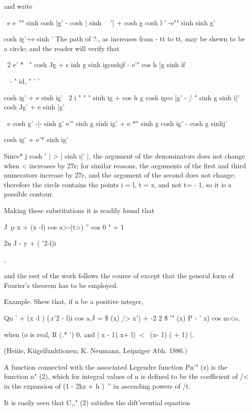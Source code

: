 {{{and write

\ e e~"" sinh cosh |g' - cosh | sinh \ \ '] + cosh g cosh l ' -e""
sinh sinh g'

cosh ig'+e sinh ' The path of ?:, as increases from - tt to tt, may be
shewn to be a circle; and the reader will verify that

\ 2 e' * ~" cosh Jg + s inh g sinh igcoshjf - e'" cos h |g sinh if

 ~ - " id, " ' '

cosh ig' + e sinh ig' \ 2 i " " " siuh ig + cos h g cosh igco |g' - /
" sinh g sinh i|' cosh Jg' + e sinh |g'

\ e cosh g' -|- sinh g' e'" sinh g sinh ig' + e *" sinh g cosh ig' -
cosh g sinlij'

cosh ig' + e'* sinh ig'

%
%

Since* j cosh ' | > | sinh i|' |, the argument of the denominators
does not change when < increases by 27r; for similar reasons, the
arguments of the first and third numerators increase by 27r, and the
argument of the second does not change; therefore the circle contains
the points i = l, t = z, and not t= - 1, so it is a possible contour.

Making these substitutions it is readily found that

J\ p x + (x -l) cos a>-(t>) '' cos 0 " + 1

2n J - y + ( '2-l)i

,

and the rest of the work follows the course of except that the
general form of Fourier's theorem has to be employed.

Example. Shew that, if n be a positive integer,

Qn ' + (x -l ) (.r'2 - l)i cos a,J = \$ (x) /> x') + -2 2 \$ '" (x) P
- ' x) cos m<o,

when (o is real, R (.* ') 0, and | x - 1) x+ l)\ < \ (x- 1) ( + 1) |.

(Heiiie, Kiigelfunktionen; K. Neumann, Leipziger Abh. 1886.)


A function connected with the associated Legeudre function Pn'" (z) is
the function n" (2), which for integral values of n is defined to be
the coefficient of /< in the expansion of (1 - 2kz + h )~'' in
ascending powers of /t.

It is easily seen that C,," (2) satisfies the dift'erential equation

}}}
